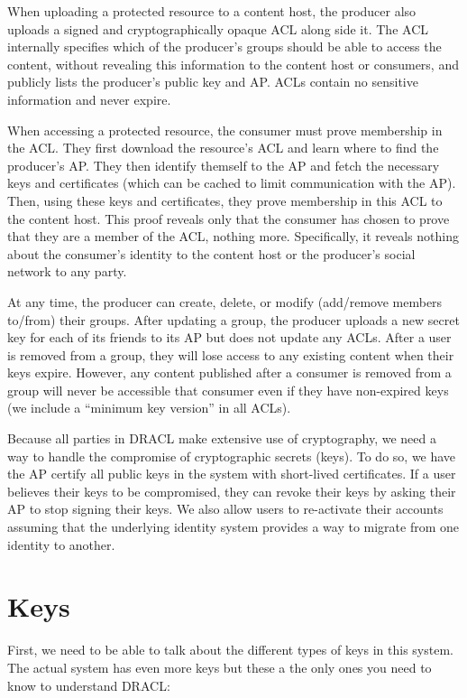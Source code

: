 \documentclass[pdftex,12pt,a4papaer,twoside,notitlepage]{report}
\begin{document}
When uploading a protected resource to a content host, the producer also uploads
a signed and cryptographically opaque ACL along side it. The ACL internally
specifies which of the producer's groups should be able to access the content,
without revealing this information to the content host or consumers, and
publicly lists the producer's public key and AP. ACLs contain no sensitive
information and never expire.

When accessing a protected resource, the consumer must prove membership in the
ACL. They first download the resource's ACL and learn where to find the
producer's AP. They then identify themself to the AP and fetch the necessary
keys and certificates (which can be cached to limit communication with the AP).
Then, using these keys and certificates, they prove membership in this ACL to
the content host. This proof reveals only that the consumer has chosen to prove
that they are a member of the ACL, nothing more. Specifically, it reveals
nothing about the consumer's identity to the content host or the producer's
social network to any party.

At any time, the producer can create, delete, or modify (add/remove members
to/from) their groups. After updating a group, the producer uploads a new secret
key for each of its friends to its AP but does not update any ACLs. After a user
is removed from a group, they will lose access to any existing content when
their keys expire. However, any content published after a consumer is removed
from a group will never be accessible that consumer even if they have
non-expired keys (we include a ``minimum key version'' in all ACLs).

Because all parties in DRACL make extensive use of cryptography, we need a way
to handle the compromise of cryptographic secrets (keys). To do so, we have the
AP certify all public keys in the system with short-lived certificates. If a
user believes their keys to be compromised, they can revoke their keys by asking
their AP to stop signing their keys. We also allow users to re-activate their
accounts assuming that the underlying identity system provides a way to migrate
from one identity to another.

\section{Keys}
\label{sec:keys}

First, we need to be able to talk about the different types of keys in this
system. The actual system has even more keys but these a the only ones you need
to know to understand DRACL:
\end{document}
